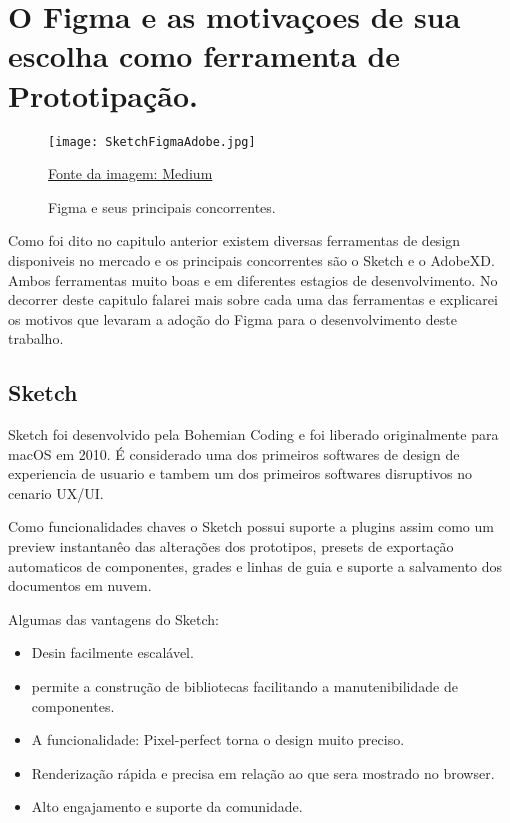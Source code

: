 \chapter[O Figma]{O Figma e as motivaçoes de sua escolha como ferramenta de Prototipação.}
\label{ch:cap4}

\begin{figure}[!h]
  \centering
  \texttt{[image: SketchFigmaAdobe.jpg]}
  \caption{Figma e seus principais concorrentes.}
  \href{https://medium.com/@xccelerate/figma-vs-adobe-xd-vs-sketch-which-wireframing-tool-is-the-best-2043d458f940}{Fonte da imagem: Medium}
  \label{fig:tcenglib}
\end{figure}

Como foi dito no capitulo anterior existem diversas ferramentas de design disponiveis no mercado e os principais concorrentes são o Sketch e o AdobeXD. Ambos ferramentas muito boas e em diferentes estagios de desenvolvimento. No decorrer deste capitulo falarei mais sobre cada uma das ferramentas e explicarei os motivos que levaram a adoção do Figma para o desenvolvimento deste trabalho.

\section{Sketch} \label{Sketch}

Sketch foi desenvolvido pela Bohemian Coding e foi liberado originalmente para macOS em 2010. É considerado uma dos primeiros softwares de design de experiencia de usuario e tambem um dos primeiros softwares disruptivos no cenario UX/UI.

Como funcionalidades chaves o Sketch possui suporte a plugins assim como um preview instantanêo das alterações dos prototipos, presets de exportação automaticos de componentes, grades e linhas de guia e suporte a salvamento dos documentos em nuvem.

Algumas das vantagens do Sketch:
\begin{itemize}
  \item Desin facilmente escalável.
  \item permite a construção de bibliotecas facilitando a manutenibilidade de componentes.
  \item A funcionalidade: Pixel-perfect torna o design muito preciso.
  \item Renderização rápida e precisa em relação ao que sera mostrado no browser.
  \item Alto engajamento e suporte da comunidade.
\end{itemize}

